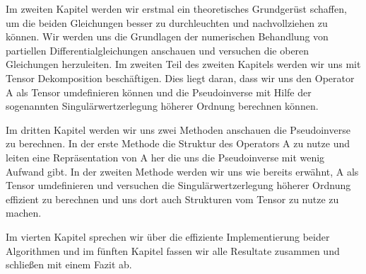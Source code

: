 Im zweiten Kapitel werden wir erstmal ein theoretisches Grundgerüst schaffen, um die beiden Gleichungen besser zu durchleuchten und nachvollziehen zu können. Wir werden uns die Grundlagen der numerischen Behandlung von partiellen Differentialgleichungen anschauen und versuchen die oberen Gleichungen herzuleiten.
Im zweiten Teil des zweiten Kapitels werden wir uns mit Tensor Dekomposition beschäftigen. Dies liegt daran, dass wir uns den Operator A als Tensor umdefinieren können und die Pseudoinverse mit Hilfe der sogenannten Singulärwertzerlegung höherer Ordnung berechnen können.

Im dritten Kapitel werden wir uns zwei Methoden anschauen die Pseudoinverse zu berechnen. In der erste Methode die Struktur des Operators A zu nutze und leiten eine Repräsentation von A her die uns die Pseudoinverse mit wenig Aufwand gibt. In der zweiten Methode werden wir uns wie bereits erwähnt, A als Tensor umdefinieren und versuchen die Singulärwertzerlegung höherer Ordnung effizient zu berechnen und uns dort auch Strukturen vom Tensor zu nutze zu machen.

Im vierten Kapitel sprechen wir über die effiziente Implementierung beider Algorithmen und im fünften Kapitel fassen wir alle Resultate zusammen und schließen mit einem Fazit ab.




